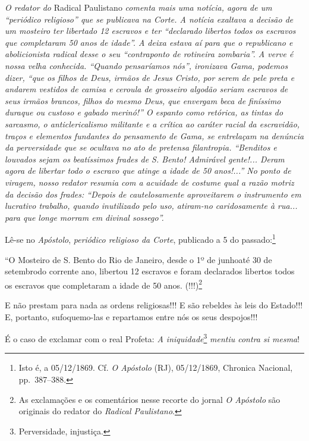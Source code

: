 \begin{didascalia}
\emph{O redator do} Radical Paulistano \emph{comenta mais uma notícia,
agora de um ``periódico religioso'' que se publicava na Corte. A notícia
exaltava a decisão de um mosteiro ter libertado 12 escravos e ter
``declarado libertos todos os escravos que completaram 50 anos de idade''.
A deixa estava aí para que o republicano e abolicionista radical desse o
seu ``contraponto de rotineira zombaria''. A verve é nossa velha
conhecida. ``Quando pensaríamos nós'', ironizava Gama, podemos dizer, ``que
os filhos de Deus, irmãos de Jesus Cristo, por serem de pele preta e
andarem vestidos de camisa e ceroula de grosseiro algodão seriam
escravos de seus irmãos brancos, filhos do mesmo Deus, que envergam beca
de finíssimo duraque ou custoso e gabado merinó!'' O espanto como
retórica, as tintas do sarcasmo, o anticlericalismo militante e a
crítica ao caráter racial da escravidão, traços e elementos fundantes do
pensamento de Gama, se entrelaçam na denúncia da perversidade que se
ocultava no ato de pretensa filantropia. ``Benditos e louvados sejam os
beatíssimos frades de S. Bento! Admirável gente!... Deram agora de
libertar todo o escravo que atinge a idade de 50 anos!...'' No ponto de
viragem, nosso redator resumia com a acuidade de costume qual a razão
motriz da decisão dos frades: ``Depois de cautelosamente aproveitarem o
instrumento em lucrativo trabalho, quando inutilizado pelo uso,
atiram-no caridosamente à rua... para que longe morram em divinal
sossego''.}
\end{didascalia}

\asterisc{}

Lê-se no \emph{Apóstolo}, \emph{periódico religioso da Corte}, publicado
a 5 do passado:\footnote{ Isto é, a 05/12/1869. Cf. \emph{O Apóstolo}
  (RJ), 05/12/1869, Chronica Nacional, pp.~387--388.}

``O Mosteiro de S. Bento do Rio de Janeiro, desde o 1º de junhoaté 30 de
setembrodo corrente ano, libertou 12 escravos e foram declarados
libertos todos os escravos que completaram a idade de 50 anos.
(!!!)\footnote{ As exclamações e os comentários nesse recorte do jornal
  \emph{O Apóstolo} são originais do redator do \emph{Radical
  Paulistano}.}

E não prestam para nada as ordens religiosas!!! E são rebeldes às leis
do Estado!!! E, portanto, sufoquemo-las e repartamos entre nós os seus
despojos!!!

É o caso de exclamar com o real Profeta: \emph{A iniquidade}\footnote{
  Perversidade, injustiça.} \emph{mentiu contra si mesma}!

